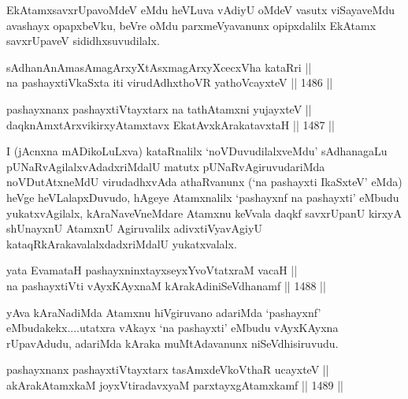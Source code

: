 \begin{artha}
EkAtamxsavxrUpavoMdeV eMdu heVLuva vAdiyU oMdeV vasutx viSayaveMdu avashayx opapxbeVku, beVre oMdu parxmeVyavanunx opipxdalilx EkAtamx savxrUpaveV sididhxsuvudilalx.
\end{artha}

\begin{shl}
sAdhanAnAmasAmagArxyXtAsxmagArxyXcecxVha kataRri || \\
na pashayxtiVkaSxta iti virudAdhxthoVR yathoVcayxteV \hfill || 1486 ||  
\end{shl}
				
\begin{shl}
pashayxnanx pashayxtiVtayxtarx na tathA\s \s tamxni yujayxteV ||  \\
daqknAmxtArxvikirxyAtamxtavx EkatAvxkArakatavxtaH \hfill || 1487 ||  
\end{shl}

\begin{artha}
I (jAcnxna mADikoLuLxva) kataRnalilx `noVDuvudilalxveMdu' sAdhanagaLu pUNaRvAgilalxvAdadxriMdalU matutx pUNaRvAgiruvudariMda noVDutAtxneMdU virudadhxvAda athaRvanunx (`na pashayxti IkaSxteV' eMda) heVge heVLalapxDuvudo, hAgeye Atamxnalilx `pashayxnf na pashayxti' eMbudu yukatxvAgilalx, kAraNaveVneMdare Atamxnu keVvala daqkf savxrUpanU kirxyA shUnayxnU AtamxnU Agiruvalilx adivxtiVyavAgiyU kataqRkArakavalalxdadxriMdalU yukatxvalalx.
\end{artha}


\begin{shl}
yata EvamataH pashayxninxtayxseyxYvoVtatxraM vacaH || \\
na pashayxtiVti vAyxKAyxnaM kArakAdiniSeVdhanamf \hfill || 1488 ||  
\end{shl}

\begin{artha}
yAva kAraNadiMda Atamxnu hiVgiruvano adariMda `pashayxnf' eMbudakekx....utatxra vAkayx `na pashayxti' eMbudu vAyxKAyxna rUpavAdudu, adariMda kAraka muMtAdavanunx niSeVdhisiruvudu.
\end{artha}

\begin{shl}
pashayxnanx pashayxtiVtayxtarx tasAmxdeVkoV\s thaR ucayxteV ||  \\
akArakAtamxkaM joyxVtiradavxyaM parxtayxgAtamxkamf \hfill || 1489 || 
\end{shl}

